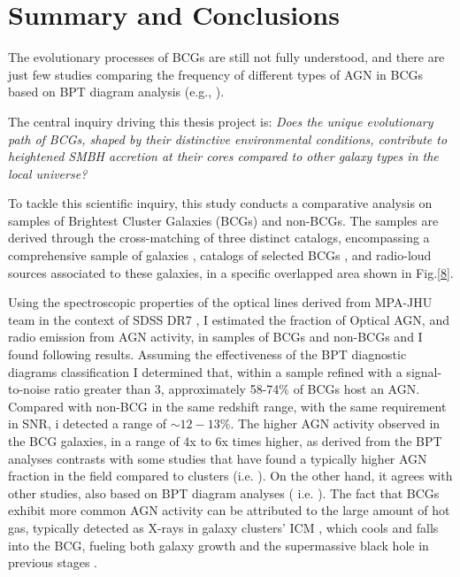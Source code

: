 \chapter*{Summary and Conclusions}

The evolutionary processes of BCGs are still not fully understood, and there are just few
studies comparing the frequency of different types of AGN in BCGs based on BPT diagram analysis (e.g., \cite{2019CoBAO..66..153F}).

The central inquiry driving this thesis project is: \textit{Does the unique evolutionary path of BCGs, shaped by their distinctive environmental conditions, contribute to heightened SMBH accretion at their cores compared to other galaxy types in the local universe?}

To tackle this scientific inquiry, this study conducts a comparative analysis on samples of Brightest Cluster Galaxies (BCGs) and non-BCGs. The samples are derived through the cross-matching of three distinct catalogs, encompassing a comprehensive sample of galaxies \cite{2009ApJS..182..543A}, catalogs of selected BCGs  \cite{2009yCat..73790867V}, and radio-loud sources \cite{2005MNRAS.362....9B} associated to these galaxies, in a specific overlapped area shown in Fig.\ref{8}.

Using the spectroscopic properties of the optical lines derived from MPA-JHU team in the context of SDSS DR7 \cite{mpa-sdss-dr7, 2009ApJS..182..543A}, I estimated the fraction of Optical AGN, and radio emission from AGN activity, in samples of BCGs and non-BCGs and I found following results.
Assuming the effectiveness of the BPT diagnostic diagrams classification I determined that, within a sample refined with a signal-to-noise ratio greater than 3, approximately 58-74$\%$ of BCGs host an AGN.
Compared with non-BCG in the same redshift range, with the same requirement in SNR, i detected a range of  $\sim 12-13\%$.
The higher AGN activity observed in the BCG galaxies, in a range of 4x to 6x times higher, as derived from the BPT analyses contrasts with some studies that have found a typically higher AGN fraction in the field compared to clusters (i.e. \cite{2017MNRAS.472..409L}).  On the other hand, it agrees with other studies, also based on BPT diagram analyses ( i.e. \cite{2012A&A...538A..15H}).  The fact that BCGs exhibit more common AGN activity can be attributed to the large amount of hot gas, typically detected as X-rays in galaxy clusters' ICM , which cools and falls into the BCG, fueling both galaxy growth and the supermassive black hole in previous stages \cite{2012A&A...538A..15H}. 

